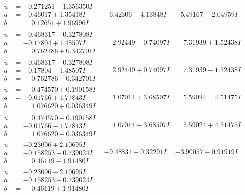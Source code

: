 \documentclass[1p]{elsarticle_modified}
\theoremstyle{definition}
\begin{document}
$$\begin{array}{c|c|c}
\begin{aligned}
u &= -0.271251 - 1.356350 I \\
a &= -0.46017 + 1.35418 I \\
b &= \phantom{-}0.12651 + 1.96996 I\end{aligned}
 & -6.42306 + 4.13848 I & -5.49167 - 2.04959 I \\ \hline\begin{aligned}
u &= -0.468317 + 0.327808 I \\
a &= -0.17804 + 1.48507 I \\
b &= \phantom{-}0.762786 + 0.342701 I\end{aligned}
 & \phantom{-}2.92449 - 0.74097 I & \phantom{-}7.31939 + 1.52438 I \\ \hline\begin{aligned}
u &= -0.468317 - 0.327808 I \\
a &= -0.17804 - 1.48507 I \\
b &= \phantom{-}0.762786 - 0.342701 I\end{aligned}
 & \phantom{-}2.92449 + 0.74097 I & \phantom{-}7.31939 - 1.52438 I \\ \hline\begin{aligned}
u &= \phantom{-}0.474570 + 0.190158 I \\
a &= -0.01766 + 1.77843 I \\
b &= \phantom{-}1.076620 + 0.036349 I\end{aligned}
 & \phantom{-}1.07014 + 3.68507 I & \phantom{-}5.59024 - 4.51475 I \\ \hline\begin{aligned}
u &= \phantom{-}0.474570 - 0.190158 I \\
a &= -0.01766 - 1.77843 I \\
b &= \phantom{-}1.076620 - 0.036349 I\end{aligned}
 & \phantom{-}1.07014 - 3.68507 I & \phantom{-}5.59024 + 4.51475 I \\ \hline\begin{aligned}
u &= -0.23006 + 2.10695 I \\
a &= -0.158253 - 0.739024 I \\
b &= \phantom{-}0.46119 - 1.91480 I\end{aligned}
 & -9.48831 - 0.32291 I & -3.90057 - 0.91919 I \\ \hline\begin{aligned}
u &= -0.23006 - 2.10695 I \\
a &= -0.158253 + 0.739024 I \\
b &= \phantom{-}0.46119 + 1.91480 I\end{aligned}

\end{array}$$
\end{document}
